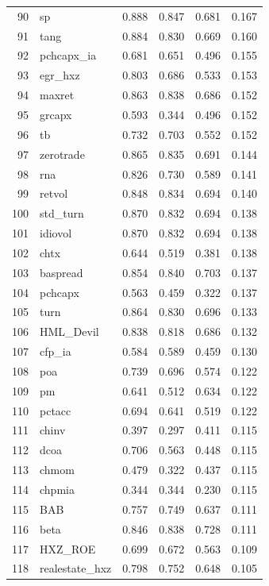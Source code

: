 \begin{footnotesize}
\begin{longtable}{rl|c|c|c|c}
		90 & sp & 0.888 & 0.847 & 0.681 & 0.167 \\ 
		91 & tang & 0.884 & 0.830 & 0.669 & 0.160 \\ 
		92 & pchcapx\_ia & 0.681 & 0.651 & 0.496 & 0.155 \\ 
		93 & egr\_hxz & 0.803 & 0.686 & 0.533 & 0.153 \\ 
		94 & maxret & 0.863 & 0.838 & 0.686 & 0.152 \\ 
		95 & grcapx & 0.593 & 0.344 & 0.496 & 0.152 \\ 
		96 & tb & 0.732 & 0.703 & 0.552 & 0.152 \\ 
		97 & zerotrade & 0.865 & 0.835 & 0.691 & 0.144 \\ 
		98 & rna & 0.826 & 0.730 & 0.589 & 0.141 \\ 
		99 & retvol & 0.848 & 0.834 & 0.694 & 0.140 \\ 
		100 & std\_turn & 0.870 & 0.832 & 0.694 & 0.138 \\ 
		101 & idiovol & 0.870 & 0.832 & 0.694 & 0.138 \\ 
		102 & chtx & 0.644 & 0.519 & 0.381 & 0.138 \\ 
		103 & baspread & 0.854 & 0.840 & 0.703 & 0.137 \\ 
		104 & pchcapx & 0.563 & 0.459 & 0.322 & 0.137 \\ 
		105 & turn & 0.864 & 0.830 & 0.696 & 0.133 \\ 
		106 & HML\_Devil & 0.838 & 0.818 & 0.686 & 0.132 \\ 
		107 & cfp\_ia & 0.584 & 0.589 & 0.459 & 0.130 \\ 
		108 & poa & 0.739 & 0.696 & 0.574 & 0.122 \\ 
		109 & pm & 0.641 & 0.512 & 0.634 & 0.122 \\ 
		110 & pctacc & 0.694 & 0.641 & 0.519 & 0.122 \\ 
		111 & chinv & 0.397 & 0.297 & 0.411 & 0.115 \\ 
		112 & dcoa & 0.706 & 0.563 & 0.448 & 0.115 \\ 
		113 & chmom & 0.479 & 0.322 & 0.437 & 0.115 \\ 
		114 & chpmia & 0.344 & 0.344 & 0.230 & 0.115 \\ 
		115 & BAB & 0.757 & 0.749 & 0.637 & 0.111 \\ 
		116 & beta & 0.846 & 0.838 & 0.728 & 0.111 \\ 
		117 & HXZ\_ROE & 0.699 & 0.672 & 0.563 & 0.109 \\ 
		118 & realestate\_hxz & 0.798 & 0.752 & 0.648 & 0.105 \\ 

\end{longtable}
\end{footnotesize}
